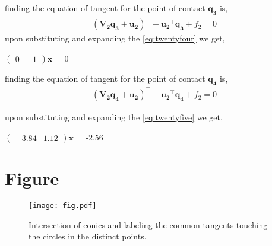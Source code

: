 \documentclass[journal,12pt,twocolumn]{IEEEtran}
\newcommand{\myvec}[1]{\ensuremath{\begin{pmatrix}#1\end{pmatrix}}}
\let\vec\mathbf
\begin{document}
finding the equation of tangent for the point of contact $\vec{q_3}$ is,
\begin{align}
\label{eq:twentyfour}
(\vec{V_2}\vec{q_3}+\vec{u_2})^{\top}+\vec{u_2}^{\top}\vec{q_3} + f_2 = 0
\end{align}
upon substituting and expanding the \eqref{eq:twentyfour} we get,
\begin{center}
$\myvec{0 & -1}\vec{x}$ = 0 
\end{center}
finding the equation of tangent for the point of contact $\vec{q_4}$ is,
\begin{align}
\label{eq:twentyfive}
(\vec{V_2}\vec{q_4}+\vec{u_2})^{\top}+\vec{u_2}^{\top}\vec{q_4} + f_2 = 0 
\end{align}

upon substituting and expanding the \eqref{eq:twentyfive} we get,
\begin{center}
$\myvec{-3.84 & 1.12}\vec{x}$ = -2.56 
\end{center}

\section{Figure}
\begin{figure}[h]
\texttt{[image: fig.pdf]}
\caption{Intersection of conics and labeling the common tangents touching the circles in the distinct points.}
		\label{fig:Figure}
\end{figure}
\end{document}
